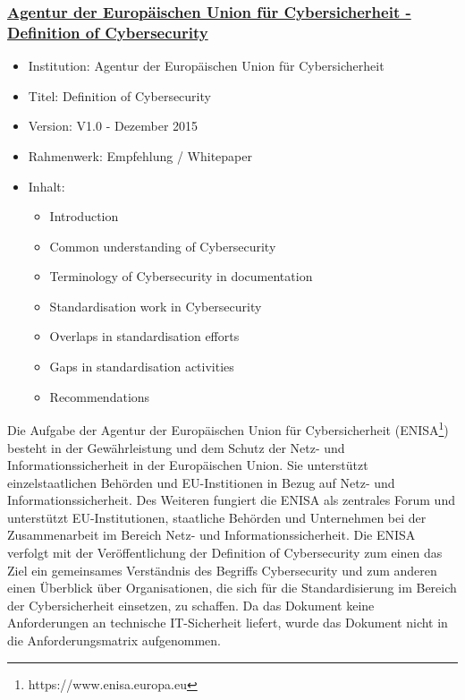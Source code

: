 
\subsubsection{\underline{Agentur der Europäischen Union für Cybersicherheit - Definition of Cybersecurity}}
\begin{itemize}
    \item Institution: Agentur der Europäischen Union für Cybersicherheit
    \item Titel: Definition of Cybersecurity \autocite{ENISA_Defition_Cybersecurity} 
    \item Version: V1.0 - Dezember 2015
    \item Rahmenwerk: Empfehlung / Whitepaper
    \item Inhalt: 
    \begin{itemize}
        \item Introduction
        \item Common understanding of Cybersecurity
        \item Terminology of Cybersecurity in documentation
        \item Standardisation work in Cybersecurity
        \item Overlaps in standardisation efforts
        \item Gaps in standardisation activities
        \item Recommendations
    \end{itemize}
\end{itemize}
\bigbreak
Die Aufgabe der \glqq{}Agentur der Europäischen Union für Cybersicherheit\grqq{} (ENISA\footnote{https://www.enisa.europa.eu}) besteht in der Gewährleistung und dem Schutz der Netz- und Informationssicherheit in der Europäischen Union. Sie unterstützt einzelstaatlichen Behörden und EU-Institionen in Bezug auf Netz- und Informationssicherheit. Des Weiteren fungiert die ENISA als zentrales Forum und unterstützt EU-Institutionen, staatliche Behörden und Unternehmen bei der Zusammenarbeit im Bereich Netz- und Informationssicherheit. Die ENISA verfolgt mit der Veröffentlichung der \glqq{}Definition of Cybersecurity\grqq{} zum einen das Ziel ein gemeinsames Verständnis des Begriffs \glqq{}Cybersecurity\grqq{} und zum anderen einen Überblick über Organisationen, die sich für die Standardisierung im Bereich der Cybersicherheit einsetzen, zu schaffen. Da das Dokument keine Anforderungen an technische IT-Sicherheit liefert, wurde das Dokument nicht in die Anforderungsmatrix aufgenommen. \autocite{ENISA}

